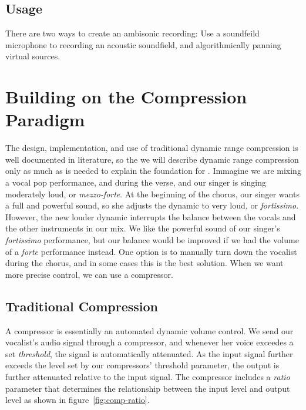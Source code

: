\subsection{Usage}
\label{sec:usage}
There are two ways to create an ambisonic recording: Use a soundfeild
microphone to recording an acoustic soundfield, and algorithmically
panning virtual sources.  

\section{Building on the Compression Paradigm}
  The design, implementation, and use of traditional
dynamic range compression is well documented in
literature,\cite{Giannoulis2012,Case2007,Deruty2014} so the we will
describe dynamic range compression only as much as is needed to
explain the foundation for \thesis. Immagine we are
mixing a vocal pop performance, and during the verse, and our singer
is singing moderately loud, or \textit{mezzo-forte}. At the beginning
of the chorus, our singer wants a full and powerful sound, so she
adjusts the dynamic to very loud, or \textit{fortissimo}. However, the
new louder dynamic interrupts the balance between the vocals and the
other instruments in our mix. We like the powerful sound of our
singer's \textit{fortissimo} performance, but our balance would be improved
if we had the volume of a \textit{forte} performance instead. One option is to
manually turn down the vocalist during the chorus, and in some cases
this is the best solution. When we want more precise control, we can
use a compressor.


\subsection{Traditional Compression}
\label{sec:trad-compr}
A compressor is essentially an automated dynamic volume control. We
send our vocalist's audio signal through a compressor, and whenever
her voice exceedes a set \textit{threshold}, the signal is
automatically attenuated. As the input signal further exceeds the
level set by our compressors' threshold parameter, the output is
further attenuated relative to the input signal. The compressor
includes a \textit{ratio} parameter that determines the relationship
between the input level and output level as shown in
figure~\ref{fig:comp-ratio}.

